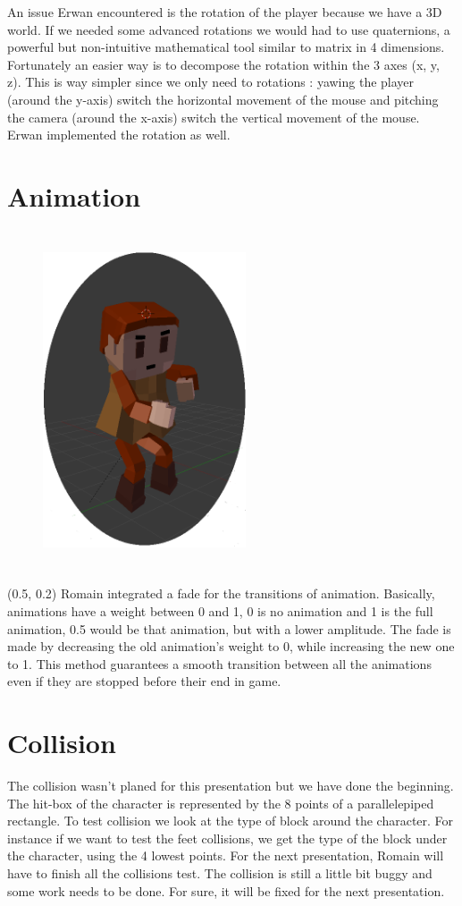 \documentclass[article]{report} %
\begin{document}
An issue Erwan encountered is the rotation of the player because we have a 3D world. If we needed some advanced rotations we would had to use quaternions, a powerful but non-intuitive mathematical tool similar to matrix in 4 dimensions. Fortunately an easier way is to decompose the rotation within the 3 axes (x, y, z). This is way simpler since we only need to rotations : yawing the player (around the y-axis) switch the horizontal movement of the mouse and pitching the camera (around the x-axis) switch the vertical movement of the mouse. Erwan implemented the rotation as well.
			\section{Animation}
				
				\begin{figure}[h]
				\includegraphics[width=6cm,   height=10cm]{images/Ent/ex.PNG}
				\end{figure}
				\begin{textblock}{0.300}(0.5, 0.2)
					 Romain integrated a fade for the transitions of animation. Basically, animations have a weight between 0 and 1, 0 is no animation and 1 is the full animation, 0.5 would be that animation, but with a lower amplitude. The fade is made by decreasing the old animation's weight to 0, while increasing the new one to 1. This method guarantees a smooth transition between all the animations even if they are stopped before their end in game.
				\end{textblock}

			\section{Collision}
				The collision wasn't planed for this presentation but we have done the beginning. The hit-box of the character is represented by the 8 points of a parallelepiped rectangle. To test collision we look at the type of block around the character. For instance if we want to test the feet collisions, we get the type of the block under the character, using the 4 lowest points. For the next presentation, Romain will have to finish all the collisions test. The collision is still a little bit buggy and some work needs to be done. For sure, it will be fixed for the next presentation.
\end{document}
